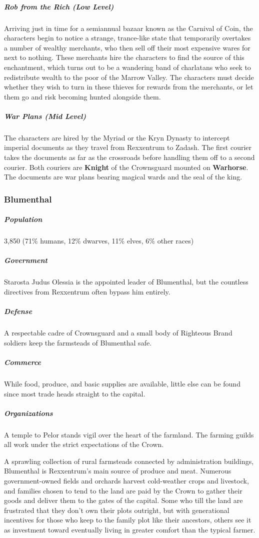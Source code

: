 \documentclass[10pt,a4paper,twoside,bg=print,twocolumn,openany,nodeprecatedcode]{dndbook}
\begin{document}
\subparagraph{Rob from the Rich (Low Level)}
Arriving just in time for a semiannual bazaar known as the Carnival of Coin, the characters begin to notice a strange, trance-like state that temporarily overtakes a number of wealthy merchants, who then sell off their most expensive wares for next to nothing. These merchants hire the characters to find the source of this enchantment, which turns out to be a wandering band of charlatans who seek to redistribute wealth to the poor of the Marrow Valley. The characters must decide whether they wish to turn in these thieves for rewards from the merchants, or let them go and risk becoming hunted alongside them.

\subparagraph{War Plans (Mid Level)}
The characters are hired by the Myriad or the Kryn Dynasty to intercept imperial documents as they travel from Rexxentrum to Zadash. The first courier takes the documents as far as the crossroads before handling them off to a second courier. Both couriers are \textbf{Knight} of the Crownsguard mounted on \textbf{Warhorse}. The documents are war plans bearing magical wards and the seal of the king.

\subsubsection{Blumenthal}
\subparagraph{Population}
3,850 (71\% humans, 12\% dwarves, 11\% elves, 6\% other races)

\subparagraph{Government}
Starosta Judus Olessia is the appointed leader of Blumenthal, but the countless directives from Rexxentrum often bypass him entirely.

\subparagraph{Defense}
A respectable cadre of Crownsguard and a small body of Righteous Brand soldiers keep the farmsteads of Blumenthal safe.

\subparagraph{Commerce}
While food, produce, and basic supplies are available, little else can be found since most trade heads straight to the capital.

\subparagraph{Organizations}
A temple to Pelor stands vigil over the heart of the farmland. The farming guilds all work under the strict expectations of the Crown.

A sprawling collection of rural farmsteads connected by administration buildings, Blumenthal is Rexxentrum's main source of produce and meat. Numerous government-owned fields and orchards harvest cold-weather crops and livestock, and families chosen to tend to the land are paid by the Crown to gather their goods and deliver them to the gates of the capital. Some who till the land are frustrated that they don't own their plots outright, but with generational incentives for those who keep to the family plot like their ancestors, others see it as investment toward eventually living in greater comfort than the typical farmer.
\end{document}
